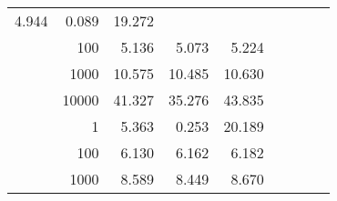 \begin{table}
\begin{tabular}{rrrrrrrrr}
						
							    
							    
	                           4.944 & 0.089 & 19.272  \\
	                
	            
					 &  
					 
					\multirow{ 1 }{*}{ 100 } &
					
						
							    
							    
	                           5.136 & 5.073 & 5.224  \\
	                
	            
					 &  
					 
					\multirow{ 1 }{*}{ 1000 } &
					
						
							    
							    
	                           10.575 & 10.485 & 10.630  \\
	                
	            
					 &  
					 
					\multirow{ 1 }{*}{ 10000 } &
					
						
							    
							    
	                           41.327 & 35.276 & 43.835  \\
	                
	            
	        
				\noalign{\smallskip}\hline
				\multirow{ 4 }{*}{ 1000000 } &
				
					
					 
					\multirow{ 1 }{*}{ 1 } &
					
						
							    
							    
	                           5.363 & 0.253 & 20.189  \\
	                
	            
					 &  
					 
					\multirow{ 1 }{*}{ 100 } &
					
						
							    
							    
	                           6.130 & 6.162 & 6.182  \\
	                
	            
					 &  
					 
					\multirow{ 1 }{*}{ 1000 } &
					
						
							    
							    
	                           8.589 & 8.449 & 8.670  \\
	                

\end{tabular}
\end{table}
